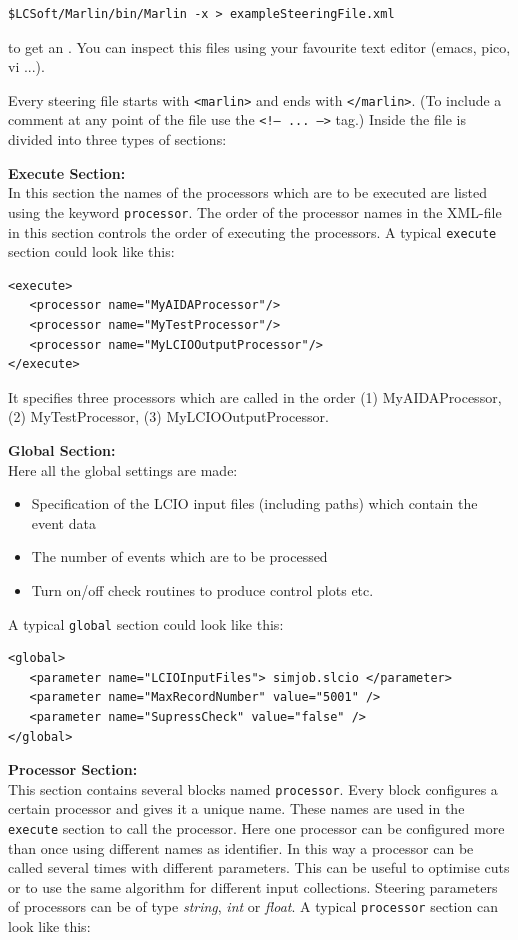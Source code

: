 \begin{verbatim}
$LCSoft/Marlin/bin/Marlin -x > exampleSteeringFile.xml
\end{verbatim}

to get an 
. You can inspect this files using your favourite
text editor (emacs, pico, vi ...). 

Every steering file starts with {\tt <marlin>} and ends with 
{\tt </marlin>}. (To include a comment at any point of the file use the 
{\tt <!-- ... -->} tag.) 
Inside the file is divided into three types of sections:

{\bf Execute Section:} \\
In this section the names of the processors which are to be 
executed are listed using the keyword {\tt processor}. 
The order of the processor names in the XML-file in this section controls the 
order of executing the processors. A typical {\tt execute} section 
could look like this:

\begin{verbatim}
<execute>
   <processor name="MyAIDAProcessor"/>
   <processor name="MyTestProcessor"/>
   <processor name="MyLCIOOutputProcessor"/>
</execute>
\end{verbatim}

It specifies three processors which are called in the order
(1) MyAIDAProcessor, (2) MyTestProcessor, (3) MyLCIOOutputProcessor.

{\bf Global Section:} \\
Here all the global settings are made: 
\begin{itemize}
\item Specification of the LCIO input files 
      (including paths) which contain the event data
\item The number of events which are to be processed
\item Turn on/off check routines to produce control plots etc. 
\end{itemize}
A typical {\tt global} section could look like this:

\begin{verbatim}
<global>
   <parameter name="LCIOInputFiles"> simjob.slcio </parameter>
   <parameter name="MaxRecordNumber" value="5001" />
   <parameter name="SupressCheck" value="false" />
</global>
\end{verbatim}

{\bf Processor Section:} \\
This section contains several blocks named {\tt processor}. Every block 
configures a certain processor and gives it a unique name. These 
names are used in the {\tt execute} section to call the processor. 
Here one processor can be configured more than once using different 
names as identifier. In this way a processor can be called several 
times with different parameters. This can be useful to 
optimise cuts or to use the same algorithm for different input collections. 
Steering parameters of processors can be of type {\em string},  
{\em int} or {\em float}. 
A typical {\tt processor} section can look like this:

